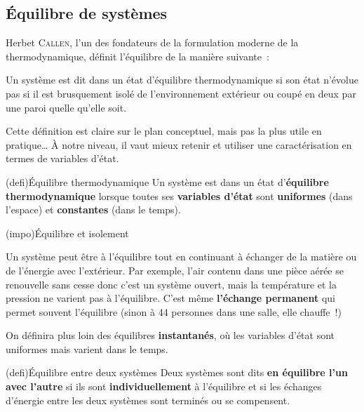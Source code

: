 \documentclass[../../main/main.tex]{subfiles}
\begin{document}
\subsection{Équilibre de systèmes}
Herbet \textsc{Callen}, l'un des fondateurs de la formulation moderne de la
thermodynamique, définit l'équilibre de la manière suivante~:
\begin{center}
	Un système est dit dans un état d'équilibre thermodynamique si son état
	n'évolue pas si il est brusquement isolé de l'environnement extérieur ou coupé
	en deux par une paroi quelle qu'elle soit.
\end{center}
Cette définition est claire sur le plan conceptuel, mais pas la plus utile en
pratique… À notre niveau, il vaut mieux retenir et utiliser une
caractérisation en termes de variables d'état.

\begin{tcb}(defi){Équilibre thermodynamique}
	Un système est dans un état d'\textbf{équilibre thermodynamique} lorsque
	toutes ses \textbf{variables d'état} sont \textbf{uniformes} (dans l'espace)
	et \textbf{constantes} (dans le temps).
\end{tcb}

\begin{tcb*}(impo){Équilibre et isolement}
	\begin{center}
	\end{center}
	Un système peut être à l'équilibre tout en continuant à échanger de la matière
	ou de l'énergie avec l'extérieur. Par exemple, l'air contenu dans une pièce
	aérée se renouvelle sans cesse donc c'est un système ouvert, mais la
	température et la pression ne varient pas à l'équilibre.
	\smallbreak
	C'est même \textbf{l'échange permanent} qui permet souvent l'équilibre (sinon
	à 44 personnes dans une salle, elle chauffe~!)
\end{tcb*}

On définira plus loin des équilibres \textbf{instantanés}, où les variables
d'état sont uniformes mais varient dans le temps.

\begin{tcb}(defi){Équilibre entre deux systèmes}
	Deux systèmes sont dits \textbf{en équilibre l'un avec l'autre} si ils sont
	\textbf{individuellement} à l'équilibre et si les échanges d'énergie entre les
	deux systèmes sont terminés ou se compensent.
\end{tcb}
\end{document}
